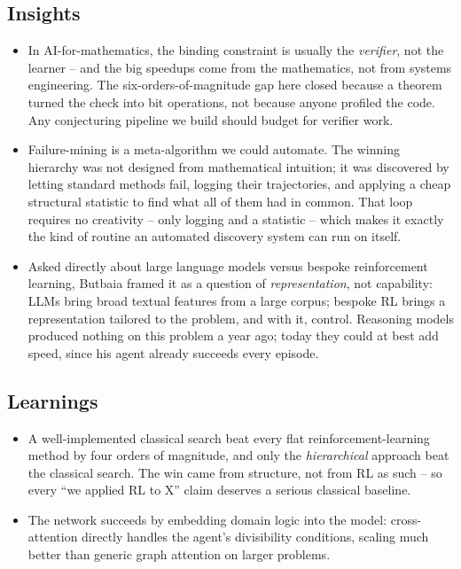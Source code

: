 \documentclass[11pt]{article}
\begin{document}
\subsection*{Insights}
\begin{itemize}
    \item In AI-for-mathematics, the binding constraint is usually the \emph{verifier}, not the learner -- and the big speedups come from the mathematics, not from systems engineering. The six-orders-of-magnitude gap here closed because a theorem turned the check into bit operations, not because anyone profiled the code. Any conjecturing pipeline we build should budget for verifier work.
    \item Failure-mining is a meta-algorithm we could automate. The winning hierarchy was not designed from mathematical intuition; it was discovered by letting standard methods fail, logging their trajectories, and applying a cheap structural statistic to find what all of them had in common. That loop requires no creativity -- only logging and a statistic -- which makes it exactly the kind of routine an automated discovery system can run on itself.
    \item Asked directly about large language models versus bespoke reinforcement learning, Butbaia framed it as a question of \emph{representation}, not capability: LLMs bring broad textual features from a large corpus; bespoke RL brings a representation tailored to the problem, and with it, control. Reasoning models produced nothing on this problem a year ago; today they could at best add speed, since his agent already succeeds every episode.
\end{itemize}

\subsection*{Learnings}
\begin{itemize}
    \item A well-implemented classical search beat every flat reinforcement-learning method by four orders of magnitude, and only the \emph{hierarchical} approach beat the classical search. The win came from structure, not from RL as such -- so every ``we applied RL to X'' claim deserves a serious classical baseline.
    \item The network succeeds by embedding domain logic into the model: cross-attention directly handles the agent's divisibility conditions, scaling much better than generic graph attention on larger problems.
\end{itemize}
\end{document}
